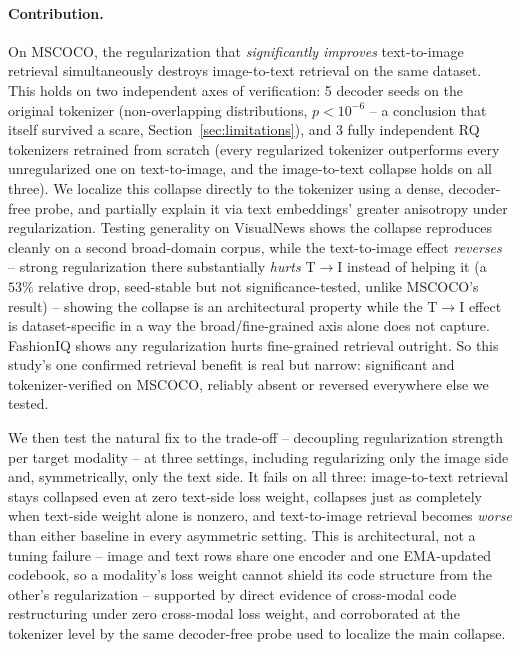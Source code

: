 \paragraph{Contribution.} On MSCOCO, the regularization that \emph{significantly improves} text-to-image retrieval simultaneously destroys image-to-text retrieval on the same dataset. This holds on two independent axes of verification: 5 decoder seeds on the original tokenizer (non-overlapping distributions, $p<10^{-6}$ -- a conclusion that itself survived a scare, Section~\ref{sec:limitations}), and 3 fully independent RQ tokenizers retrained from scratch (every regularized tokenizer outperforms every unregularized one on text-to-image, and the image-to-text collapse holds on all three). We localize this collapse directly to the tokenizer using a dense, decoder-free probe, and partially explain it via text embeddings' greater anisotropy under regularization. Testing generality on VisualNews shows the collapse reproduces cleanly on a second broad-domain corpus, while the text-to-image effect \emph{reverses} -- strong regularization there substantially \emph{hurts} T$\to$I instead of helping it (a $53\%$ relative drop, seed-stable but not significance-tested, unlike MSCOCO's result) -- showing the collapse is an architectural property while the T$\to$I effect is dataset-specific in a way the broad/fine-grained axis alone does not capture. FashionIQ shows any regularization hurts fine-grained retrieval outright. So this study's one confirmed retrieval benefit is real but narrow: significant and tokenizer-verified on MSCOCO, reliably absent or reversed everywhere else we tested.

We then test the natural fix to the trade-off -- decoupling regularization strength per target modality -- at three settings, including regularizing only the image side and, symmetrically, only the text side. It fails on all three: image-to-text retrieval stays collapsed even at zero text-side loss weight, collapses just as completely when text-side weight alone is nonzero, and text-to-image retrieval becomes \emph{worse} than either baseline in every asymmetric setting. This is architectural, not a tuning failure -- image and text rows share one encoder and one EMA-updated codebook, so a modality's loss weight cannot shield its code structure from the other's regularization -- supported by direct evidence of cross-modal code restructuring under zero cross-modal loss weight, and corroborated at the tokenizer level by the same decoder-free probe used to localize the main collapse.

